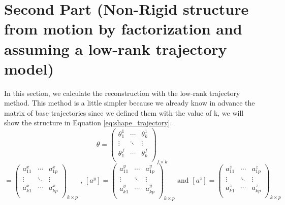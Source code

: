 \section{Second Part (Non-Rigid structure from motion by factorization and assuming a low-rank trajectory model)}
\noindent In this section, we calculate the reconstruction with the low-rank trajectory method. This method is a little simpler because we already know in advance the matrix of base trajectories since we defined them with the value of k, we will show the structure in Equation \ref{eq:shape_trajectory}.
\begin{equation*}
	\theta=
	\begin{pmatrix}
		\theta_{1}^{1} &  \cdots & \theta_{k}^{1}\\		
		\vdots &  \ddots & \vdots \\
		\theta_{1}^{f} &  \cdots & \theta_{k}^{f}\\		
	\end{pmatrix}_{f\times k}
\end{equation*}
\begin{equation*}
	[a^{x}]=
	\begin{pmatrix}
		a_{11}^{x} &  \cdots & a_{1p}^{x}\\		
		\vdots &  \ddots & \vdots \\
		a_{k1}^{x} &  \cdots & a_{kp}^{x}\\		
	\end{pmatrix}_{k\times p}\text{ , }
	[a^{y}]=
	\begin{pmatrix}
		a_{11}^{y} &  \cdots & a_{1p}^{y}\\		
		\vdots &  \ddots & \vdots \\
		a_{k1}^{y} &  \cdots & a_{kp}^{y}\\		
	\end{pmatrix}_{k\times p}\text{ and }
	[a^{z}]=
	\begin{pmatrix}
		a_{11}^{z} &  \cdots & a_{1p}^{z}\\		
		\vdots &  \ddots & \vdots \\
		a_{k1}^{z} &  \cdots & a_{kp}^{z}\\		
	\end{pmatrix}_{k\times p}
\end{equation*}

